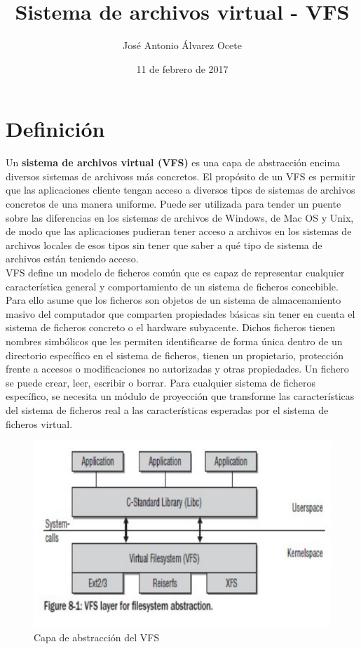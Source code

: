 \documentclass[11pt,a4paper]{article}
\title{Sistema de archivos virtual - VFS}
\author{José Antonio Álvarez Ocete}
\date{11 de febrero de 2017}
\newcommand\tab[1][1cm]{\hspace*{#1}}
\begin{document}
\maketitle

\section {Definición}

\tab Un \textbf{sistema de archivos virtual (VFS)}  es una capa de abstracción encima diversos sistemas de archivoss más concretos. El propósito de un VFS es permitir que las aplicaciones cliente tengan acceso a diversos tipos de sistemas de archivos concretos de una manera uniforme. Puede ser utilizada para tender un puente sobre las diferencias en los sistemas de archivos de Windows, de Mac OS y Unix, de modo que las aplicaciones pudieran tener acceso a archivos en los sistemas de archivos locales de esos tipos sin tener que saber a qué tipo de sistema de archivos están teniendo acceso. \\

\tab VFS define un modelo de ficheros común que es capaz de representar cualquier característica general y comportamiento de un sistema de ficheros concebible. Para ello asume que los ficheros son objetos de un sistema de almacenamiento masivo del computador que comparten propiedades básicas sin tener en cuenta el sistema de ficheros concreto o el hardware subyacente. Dichos ficheros tienen nombres simbólicos que les permiten identificarse de forma única dentro de un directorio específico en el sistema de ficheros, tienen un propietario, protección frente a accesos o modificaciones no autorizadas y otras propiedades. Un fichero se puede crear, leer, escribir o borrar. Para cualquier sistema de ficheros específico, se necesita un módulo de proyección que transforme las características del sistema de ficheros real a las características esperadas por el sistema de ficheros virtual. \cite{stalling} \\

\begin{figure}[H]
  \centering
 \includegraphics[scale=0.5]{capturas/1}
 \caption{Capa de abstracción del VFS \cite{diapo}} \label{fig:AQUI}
\end{figure}
\end{document}
